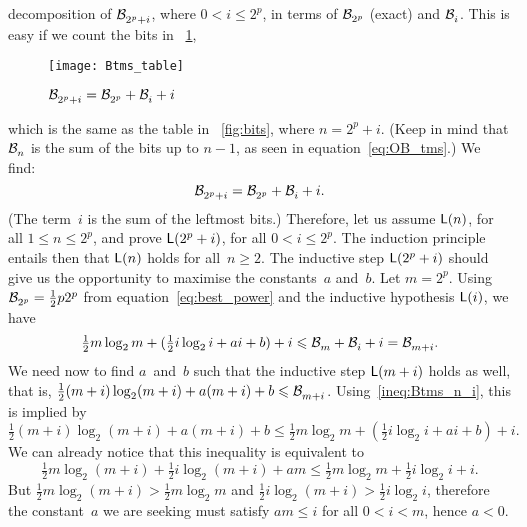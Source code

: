decomposition of \(\mathcal{B}_{2^p+i}^{}\), where \(0 < i \leqslant 2^p\), in
terms of \(\mathcal{B}_{2^p}^{}\) (exact) and \(\mathcal{B}_{i}^{}\). This is easy if we
count the bits in \fig~\ref{fig:Btms_table},
\begin{figure}[b]
\centering
\texttt{[image: Btms\_table]}
\caption{$\protect\mathcal{B}_{2^p+i}^{} = \protect\mathcal{B}_{2^p}^{}
  + \protect\mathcal{B}_{i}^{} + i$\label{fig:Btms_table}}
\end{figure}
which is the same as the table in \fig~\ref{fig:bits}, where
\(n=2^p+i\). (Keep in mind that \(\mathcal{B}_{n}^{}\) is the sum of the bits up
to \(n-1\), as seen in equation~\eqref{eq:OB_tms}.) We find:
\begin{equation*}
\mathcal{B}_{2^p+i}^{} = \mathcal{B}_{2^p}^{} + \mathcal{B}_{i}^{} + i.
\end{equation*}
(The term~\(i\) is the sum of the leftmost bits.) Therefore, let us
assume \(\textsf{L}({n})\), for all \(1 \leqslant n \leqslant 2^p\), and
prove \(\textsf{L}({2^p+i})\), for all \(0 < i \leqslant 2^p\). The
induction principle entails then that \(\textsf{L}({n})\) holds for
all~\(n \geqslant 2\). The inductive step \(\textsf{L}({2^p+i})\) should
give us the opportunity to maximise the constants~\(a\) and~\(b\). Let
\(m=2^p\). Using \(\mathcal{B}_{2^p}^{} = \tfrac{1}{2}p2^p\) from
equation~\eqref{eq:best_power} and the inductive hypothesis
\(\textsf{L}({i})\), we have
\begin{equation}
\tfrac{1}{2}m\log_2 m + (\tfrac{1}{2}i\log_2 i + ai + b) + i
\leqslant 
\mathcal{B}_{m}^{} + \mathcal{B}_{i}^{} + i = \mathcal{B}_{m+i}^{}.
\label{ineq:Btms_n_i}
\end{equation}
We need now to find \(a\)~and~\(b\) such that the inductive step
\(\textsf{L}({m+i})\) holds as well, that is,
\(\tfrac{1}{2}(m+i)\log_2(m+i) + a(m+i) + b \leqslant \mathcal{B}_{m+i}^{}\).
Using~\eqref{ineq:Btms_n_i}, this is implied by
\begin{equation*}
\tfrac{1}{2}(m+i)\log_2(m+i) + a(m+i) + b
\leqslant
\tfrac{1}{2}m\log_2 m + (\tfrac{1}{2}i\log_2 i + ai + b) + i.
\end{equation*}
We can already notice that this inequality is equivalent to
\begin{equation}
\tfrac{1}{2}m\log_2(m+i) + \tfrac{1}{2}i\log_2(m+i) + am
\leqslant \tfrac{1}{2}m\log_2 m + \tfrac{1}{2}i\log_2 i + i.
\label{ineq:Btms_n_i_details}
\end{equation}
But \(\tfrac{1}{2}m\log_2(m+i) > \tfrac{1}{2}m\log_2 m\) and
\(\tfrac{1}{2}i\log_2(m+i) > \tfrac{1}{2}i\log_2 i\), therefore the
constant~\(a\) we are seeking must satisfy \(am \leqslant i\) for all
\(0 < i < m\), hence \(a < 0\).

